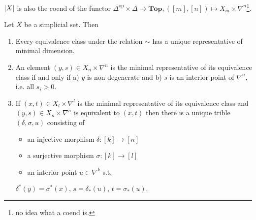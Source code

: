 \documentclass[language=english]{TemplateLecture}
\begin{document}
\(\lvert X\rvert\) is also the coend of the functor \(\Delta^{\text{op}}\times \Delta \to \mathbf{Top}, ([m], [n])\mapsto X_m\times \nabla^n\)\footnote{no idea what a coend is.}.

\begin{proposition}
    Let \(X\) be a simplicial set. Then
    \begin{enumerate}
        \item Every equivalence class under the relation \(\sim\) has a unique representative of minimal dimension.
        \item An element \((y,s)\in X_n\times \nabla^n\) is the minimal representative of its equivalence class if and only if  a) \(y\) is non-degenerate and b) \(s\) is an interior point of \(\nabla^n\), i.e. all \(s_i > 0\).
        \item If \((x,t)\in X_l\times \nabla^l\) is the minimal representative of its equivalence class and \((y,s) \in X_n\times \nabla^n\) is equivalent to \((x,t)\) then there is a unique trible \((\delta, \sigma, u)\) consisting of
        \begin{itemize}
            \item an injective morphism \(\delta\colon [k]\to [n]\)
            \item a surjective morphism \(\sigma\colon [k]\to [l]\)
            \item an interior point \(u\in \nabla^k\) s.t.
        \end{itemize}
        \(\delta^*(y) = \sigma^*(x)\), \(s = \delta_*(u)\), \(t = \sigma_*(u)\).
    \end{enumerate}
\end{proposition}
\end{document}
